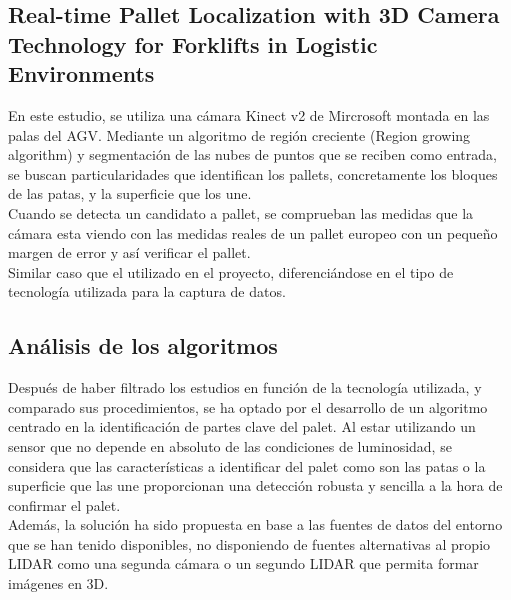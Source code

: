 \subsection{Real-time Pallet Localization with 3D Camera Technology for Forklifts in Logistic Environments \cite{art7:realtimelocalization}}
En este estudio, se utiliza una cámara Kinect v2 de Mircrosoft montada en las palas del AGV. Mediante un algoritmo de región creciente (Region growing algorithm) y segmentación de las nubes de puntos que se reciben como entrada, se buscan particularidades que identifican los pallets, concretamente los bloques de las patas, y la superficie que los une. \\ Cuando se detecta un candidato a pallet, se comprueban las medidas que la cámara esta viendo con las medidas reales de un pallet europeo con un pequeño margen de error y así verificar el pallet. \\ Similar caso que el utilizado en el proyecto, diferenciándose en el tipo de tecnología utilizada para la captura de datos.

\subsection{Análisis de los algoritmos}
Después de haber filtrado los estudios en función de la tecnología utilizada, y comparado sus procedimientos, se ha optado por el desarrollo de un algoritmo centrado en la identificación de partes clave del palet. Al estar utilizando un sensor que no depende en absoluto de las condiciones de luminosidad, se considera que las características a identificar del palet como son las patas o la superficie que las une proporcionan una detección robusta y sencilla a la hora de confirmar el palet. \\ Además, la solución ha sido propuesta en base a las fuentes de datos del entorno que se han tenido disponibles, no disponiendo de fuentes alternativas al propio LIDAR como una segunda cámara o un segundo LIDAR que permita formar imágenes en 3D.
